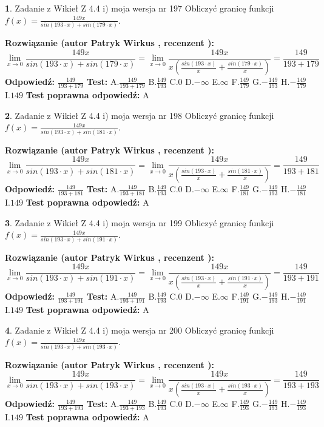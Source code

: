 \documentclass[12pt, a4paper]{article}
\theoremstyle{definition} %
\newtheorem{zad}{}
\newcommand{\zadStart}[1]{\begin{zad}#1\newline}
\newcommand{\zadStop}{\end{zad}}
\newcommand{\rozwStart}[2]{\noindent \textbf{Rozwiązanie (autor #1 , recenzent #2): }\newline}
\newcommand{\rozwStop}{\newline}
\newcommand{\odpStart}{\noindent \textbf{Odpowiedź:}\newline}
\newcommand{\odpStop}{\newline}
\newcommand{\testStart}{\noindent \textbf{Test:}\newline}
\newcommand{\testStop}{\newline}
\newcommand{\kluczStart}{\noindent \textbf{Test poprawna odpowiedź:}\newline}
\newcommand{\kluczStop}{\newline}
\begin{document}
\zadStart{Zadanie z Wikieł Z 4.4 i) moja wersja nr 197}
Obliczyć granicę funkcji $f(x)=\frac{149x}{sin(193\cdot x) +sin(179\cdot x)}$.
\zadStop
\rozwStart{Patryk Wirkus}{}
$$\lim\limits_{x\to 0}\frac{149x}{sin(193\cdot x) +sin(179\cdot x)}=\lim\limits_{x\to 0}\frac{149x}{x(\frac{sin(193\cdot x)}{x}+\frac{sin(179\cdot x)}{x})}=\frac{149}{193+179}$$
\rozwStop
\odpStart
$\frac{149}{193+179}$
\odpStop
\testStart
A.$\frac{149}{193+179}$
B.$\frac{149}{193}$
C.$0$
D.$-\infty$
E.$\infty$
F.$\frac{149}{179}$
G.$-\frac{149}{193}$
H.$-\frac{149}{179}$
I.$149$
\testStop
\kluczStart
A
\kluczStop



\zadStart{Zadanie z Wikieł Z 4.4 i) moja wersja nr 198}
Obliczyć granicę funkcji $f(x)=\frac{149x}{sin(193\cdot x) +sin(181\cdot x)}$.
\zadStop
\rozwStart{Patryk Wirkus}{}
$$\lim\limits_{x\to 0}\frac{149x}{sin(193\cdot x) +sin(181\cdot x)}=\lim\limits_{x\to 0}\frac{149x}{x(\frac{sin(193\cdot x)}{x}+\frac{sin(181\cdot x)}{x})}=\frac{149}{193+181}$$
\rozwStop
\odpStart
$\frac{149}{193+181}$
\odpStop
\testStart
A.$\frac{149}{193+181}$
B.$\frac{149}{193}$
C.$0$
D.$-\infty$
E.$\infty$
F.$\frac{149}{181}$
G.$-\frac{149}{193}$
H.$-\frac{149}{181}$
I.$149$
\testStop
\kluczStart
A
\kluczStop



\zadStart{Zadanie z Wikieł Z 4.4 i) moja wersja nr 199}
Obliczyć granicę funkcji $f(x)=\frac{149x}{sin(193\cdot x) +sin(191\cdot x)}$.
\zadStop
\rozwStart{Patryk Wirkus}{}
$$\lim\limits_{x\to 0}\frac{149x}{sin(193\cdot x) +sin(191\cdot x)}=\lim\limits_{x\to 0}\frac{149x}{x(\frac{sin(193\cdot x)}{x}+\frac{sin(191\cdot x)}{x})}=\frac{149}{193+191}$$
\rozwStop
\odpStart
$\frac{149}{193+191}$
\odpStop
\testStart
A.$\frac{149}{193+191}$
B.$\frac{149}{193}$
C.$0$
D.$-\infty$
E.$\infty$
F.$\frac{149}{191}$
G.$-\frac{149}{193}$
H.$-\frac{149}{191}$
I.$149$
\testStop
\kluczStart
A
\kluczStop



\zadStart{Zadanie z Wikieł Z 4.4 i) moja wersja nr 200}
Obliczyć granicę funkcji $f(x)=\frac{149x}{sin(193\cdot x) +sin(193\cdot x)}$.
\zadStop
\rozwStart{Patryk Wirkus}{}
$$\lim\limits_{x\to 0}\frac{149x}{sin(193\cdot x) +sin(193\cdot x)}=\lim\limits_{x\to 0}\frac{149x}{x(\frac{sin(193\cdot x)}{x}+\frac{sin(193\cdot x)}{x})}=\frac{149}{193+193}$$
\rozwStop
\odpStart
$\frac{149}{193+193}$
\odpStop
\testStart
A.$\frac{149}{193+193}$
B.$\frac{149}{193}$
C.$0$
D.$-\infty$
E.$\infty$
F.$\frac{149}{193}$
G.$-\frac{149}{193}$
H.$-\frac{149}{193}$
I.$149$
\testStop
\kluczStart
A
\kluczStop
\end{document}
